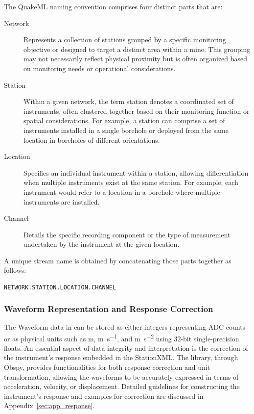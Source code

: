 The QuakeML naming convention comprises four distinct parts that are:

\begin{description}
  \item[Network] Represents a collection of stations grouped by a specific monitoring objective or designed to target a distinct area within a mine. This grouping may not necessarily reflect physical proximity but is often organized based on monitoring needs or operational considerations.
  \item[Station] Within a given network, the term station denotes a coordinated set of instruments, often clustered together based on their monitoring function or spatial considerations. For example, a station can comprise a set of instruments installed in a single borehole or deployed from the same location in boreholes of different orientations.
  \item[Location] Specifies an individual instrument within a station, allowing differentiation when multiple instruments exist at the same station. For example, each instrument would refer to a location in a borehole where multiple instruments are installed.
  \item[Channel] Details the specific recording component or the type of measurement undertaken by the instrument at the given location.
\end{description}

A unique stream name is obtained by concatenating those parts together as follows:
\begin{center}
\texttt{NETWORK.STATION.LOCATION.CHANNEL}
\end{center}

\subsubsection{Waveform Representation and Response Correction}

The Waveform data in \museismic can be stored as either integers representing ADC counts or as physical units such as \si{\meter}, \si{\meter\per\second}, and \si{\meter\per\second\squared} using 32-bit single-precision floats. An essential aspect of data integrity and interpretation is the correction of the instrument's response embedded in the StationXML. The \muquake library, through Obspy, provides functionalities for both response correction and unit transformation, allowing the waveforms to be accurately expressed in terms of acceleration, velocity, or displacement. Detailed guidelines for constructing the instrument's response and examples for correction are discussed in Appendix~\ref{sec:app_response}.

